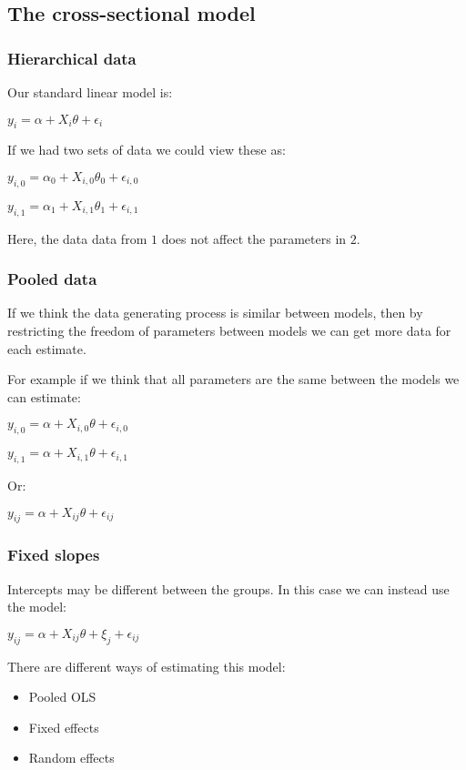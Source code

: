 
\subsection{The cross-sectional model}

\subsubsection{Hierarchical data}

Our standard linear model is:

\(y_i=\alpha + X_i\theta +\epsilon_i\)

If we had two sets of data we could view these as:

\(y_{i,0}=\alpha_0 + X_{i,0}\theta_0 +\epsilon_{i,0}\)

\(y_{i,1}=\alpha_1 + X_{i,1}\theta_1 +\epsilon_{i,1}\)

Here, the data data from \(1\) does not affect the parameters in \(2\).

\subsubsection{Pooled data}

If we think the data generating process is similar between models, then by restricting the freedom of parameters between models we can get more data for each estimate.

For example if we think that all parameters are the same between the models we can estimate:

\(y_{i,0}=\alpha + X_{i,0}\theta +\epsilon_{i,0}\)

\(y_{i,1}=\alpha + X_{i,1}\theta +\epsilon_{i,1}\)

Or:

\(y_{ij}=\alpha + X_{ij}\theta + \epsilon_{ij}\)

\subsubsection{Fixed slopes}

Intercepts may be different between the groups. In this case we can instead use the model:

\(y_{ij}=\alpha + X_{ij}\theta + \xi_j + \epsilon_{ij}\)

There are different ways of estimating this model:

\begin{itemize}
\item Pooled OLS
\item Fixed effects
\item Random effects
\end{itemize}

